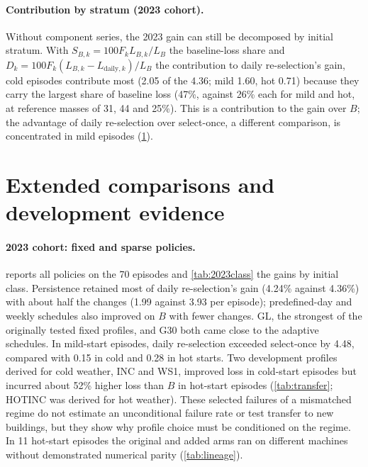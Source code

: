 \paragraph{Contribution by stratum (2023 cohort).}
Without component series, the 2023 gain can still be decomposed by initial stratum. With $S_{B,k} = 100F_kL_{B,k}/L_B$
the baseline-loss share and $D_k = 100F_k(L_{B,k}-L_{\mathrm{daily},k})/L_B$ the contribution to daily re-selection's
gain, cold episodes contribute most (2.05 of the 4.36\pp; mild 1.60, hot 0.71) because they carry the largest share of
baseline loss (47\%, against 26\% each for mild and hot, at reference masses of 31, 44 and 25\%). This is a contribution to the gain over $B$; the advantage of daily
re-selection over select-once, a different comparison, is concentrated in mild episodes (\cref{app:extended}).

\section{Extended comparisons and development evidence}\label{app:extended}
\paragraph{2023 cohort: fixed and sparse policies.}
 reports all policies on the 70 episodes and \cref{tab:2023class} the gains by initial class.
Persistence retained most of daily re-selection's gain (4.24\% against 4.36\%) with about half the changes (1.99 against
3.93 per episode); predefined-day and weekly schedules
also improved on $B$ with fewer changes. GL, the strongest of the originally tested fixed profiles, and G30 both came
close to the adaptive schedules. In mild-start episodes, daily re-selection exceeded select-once by 4.48\pp, compared
with 0.15\pp{} in cold and 0.28\pp{} in hot starts. Two development profiles derived for cold weather, INC and WS1,
improved loss in cold-start episodes but incurred about 52\% higher loss than $B$ in hot-start episodes (\cref{tab:transfer};
HOTINC was derived for hot weather). These selected failures of a mismatched regime do not estimate an unconditional failure
rate or test transfer to new buildings, but they show why profile choice must be conditioned on the regime. In 11 hot-start
episodes the original and added arms ran on different machines without demonstrated numerical parity (\cref{tab:lineage}).

